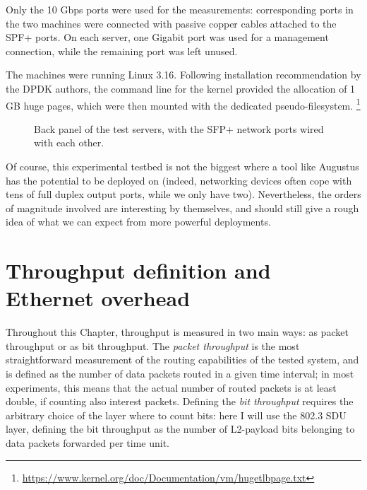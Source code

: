 \documentclass[11pt,a4paper,twoside,titlepage,openany]{book}
\begin{document}
Only the 10 Gbps ports were used for the measurements: corresponding ports in the two machines were connected with passive copper cables attached to the SPF+ ports. On each server, one Gigabit port was used for a management connection, while the remaining port was left unused.

The machines were running Linux 3.16. Following installation recommendation by the DPDK authors, the command line for the kernel provided the allocation of 1 GB huge pages, which were then mounted with the dedicated pseudo-filesystem.%
\footnote{\url{https://www.kernel.org/doc/Documentation/vm/hugetlbpage.txt}}

\begin{figure}[tb]
  \begin{center}
    \caption[Back panel of the test servers]{Back panel of the test servers, with the SFP+ network ports wired with each other.}
    \label{fig:test.servers_backpane}
  \end{center}
\end{figure}

Of course, this experimental testbed is not the biggest where a tool like Augustus has the potential to be deployed on (indeed, networking devices often cope with tens of full duplex output ports, while we only have two). Nevertheless, the orders of magnitude involved are interesting by themselves, and should still give a rough idea of what we can expect from more powerful deployments.

\section{Throughput definition and Ethernet overhead}\label{sec:test.overhead}
Throughout this Chapter, throughput is measured in two main ways: as packet throughput or as bit throughput.
The \emph{packet throughput} is the most straightforward measurement of the routing capabilities of the tested system, and is defined as the number of data packets routed in a given time interval; in most experiments, this means that the actual number of routed packets is at least double, if counting also interest packets.
Defining the \emph{bit throughput} requires the arbitrary choice of the layer where to count bits: here I will use the 802.3 \gls{SDU} layer, defining the bit throughput as the number of L2-payload bits belonging to data packets forwarded per time unit.
\end{document}
